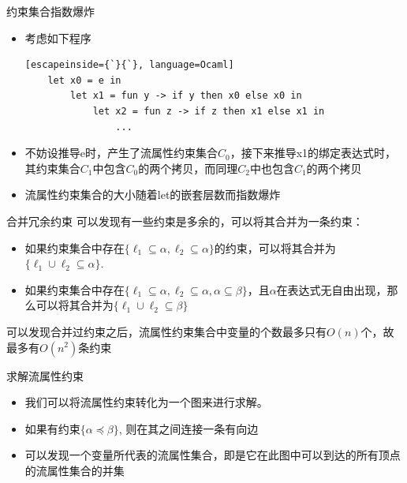 \documentclass[9pt]{beamer}
\begin{document}
\begin{frame}[fragile]{约束集合指数爆炸}
	\begin{itemize}
		\item 考虑如下程序
		\begin{lstlisting}[escapeinside={`}{`}, language=Ocaml]
	let x0 = e in
		let x1 = fun y -> if y then x0 else x0 in
			let x2 = fun z -> if z then x1 else x1 in
				...
		\end{lstlisting}
		\item 不妨设推导e时，产生了流属性约束集合$C_0$，接下来推导x1的绑定表达式时，其约束集合$C_1$中包含$C_0$的两个拷贝，而同理$C_2$中也包含$C_1$的两个拷贝
		\vspace{0.3em}
		\item 流属性约束集合的大小随着let的嵌套层数而指数爆炸
	\end{itemize}
\end{frame}

\begin{frame}[fragile]{合并冗余约束}
	可以发现有一些约束是多余的，可以将其合并为一条约束：
	\vspace{0.5em}
	\begin{itemize}
				\item 如果约束集合中存在$\{\ell_1\subseteq \alpha, \ell_2\subseteq \alpha\}$的约束，可以将其合并为$\{\ell_1\cup\ell_2 \subseteq \alpha\}$. 
		\vspace{0.3em}
		\item 如果约束集合中存在$\{\ell_1 \subseteq \alpha, \ell_2 \subseteq \alpha, \alpha\subseteq \beta\}$，且$\alpha$在表达式无自由出现，那么可以将其合并为$\{\ell_1\cup\ell_2\subseteq\beta\}$
	\end{itemize}
	\vspace{0.5em}
	可以发现合并过约束之后，流属性约束集合中变量的个数最多只有$O(n)$个，故最多有$O(n^2)$条约束
\end{frame}

\begin{frame}[fragile]{求解流属性约束}
	\begin{itemize}
		\item 我们可以将流属性约束转化为一个图来进行求解。
		\vspace{0.3em}
		\item 如果有约束$\{\alpha\preceq\beta\}$, 则在其之间连接一条有向边
		\vspace{0.3em}
		\item 可以发现一个变量所代表的流属性集合，即是它在此图中可以到达的所有顶点的流属性集合的并集
	\end{itemize}
\end{frame}
\end{document}
